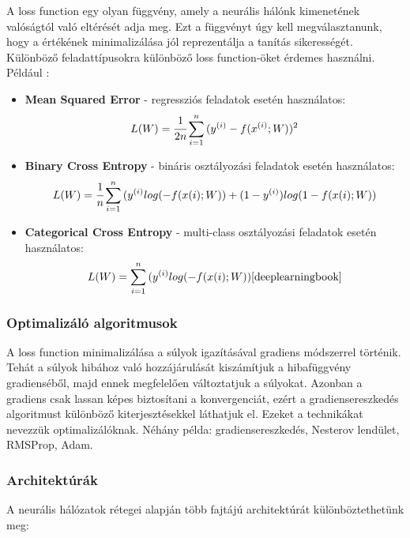 {A loss function egy olyan függvény, amely a neurális hálónk kimenetének valóságtól való eltérését adja meg. Ezt a függvényt úgy kell megválasztanunk, hogy a értékének minimalizálása jól reprezentálja a tanítás sikerességét. Különböző feladattípusokra különböző loss function-öket érdemes használni. Például \cite{deeplearningbook}:
\begin{itemize}
 \item \textbf{Mean Squared Error} - regressziós feladatok esetén használatos:
\begin{equation}
	L(W) = \cfrac{1}{2n}\sum_{i=1}^{n}{(y^{(i)}-f(x^{(i)};W))^2}
\end{equation}
 \item \textbf{Binary Cross Entropy} - bináris osztályozási feladatok esetén használatos:
\begin{equation}
	L(W) = \cfrac{1}{n}\sum_{i=1}^{n}{(y^{(i)}log(-f(x{(i)};W))+(1-y^{(i)})log(1-f(x{(i)};W))}
\end{equation}
 \item \textbf{Categorical Cross Entropy} - multi-class osztályozási feladatok esetén használatos:
\begin{equation}
	L(W) = \sum_{i=1}^{n}{(y^{(i)}log(-f(x{(i)};W))} \cite{deeplearningbook}
\end{equation}
 \end{itemize}

\subsubsection{Optimalizáló algoritmusok}

A loss function minimalizálása a súlyok igazításával gradiens módszerrel történik. Tehát a súlyok hibához való hozzájárulását kiszámítjuk a hibafüggvény gradienséből, majd ennek megfelelően változtatjuk a súlyokat. Azonban a gradiens csak lassan képes biztosítani a konvergenciát, ezért a gradiensereszkedés algoritmust különböző kiterjesztésekkel láthatjuk el. Ezeket a technikákat nevezzük optimalizálóknak. Néhány példa: gradiensereszkedés, Nesterov lendület, RMSProp, Adam. \cite{deeplearningbook}

\subsubsection{Architektúrák}

A neurális hálózatok rétegei alapján több fajtájú architektúrát különböztethetünk meg:

}
